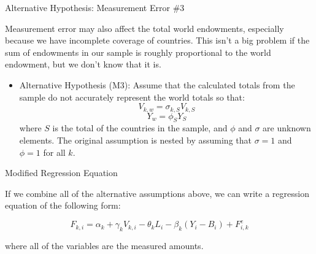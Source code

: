 \documentclass[aspectratio=169]{beamer}
\begin{document}
\begin{frame}{Alternative Hypothesis:  Measurement Error \#3}

Measurement error may also affect the total world endowments, especially because we have incomplete coverage of countries.  This isn’t a big problem if the sum of endowments in our sample is roughly proportional to the world endowment, but we don’t know that it is.

\begin{itemize}
    \item<1-> Alternative Hypothesis (M3):  Assume that the calculated totals from the sample do not accurately represent the world totals so that:
    \begin{equation*}
        V_{k,w} = \sigma_{k,S}V_{k,S}
    \end{equation*}
    \begin{equation*}
        Y_{w} = \phi_{S}Y_{S}
    \end{equation*}
    where $ S $ is the total of the countries in the sample, and $ \phi $ and $ \sigma $ are unknown elements.  The original assumption is nested by assuming that $ \sigma = 1 $ and $\phi = 1 $ for all $ k $. 
\end{itemize}
    
\end{frame}


\begin{frame}{Modified Regression Equation}

If we combine all of the alternative assumptions above, we can write a regression equation of the following form:

\begin{equation}
    F_{k,i} = \alpha_{k} + \gamma_{k}V_{k,i} - \theta_{k}L_{i} - \beta_{k}\left( Y_{i} - B_{i} \right) + F_{i,k}^{e}
    \label{eq:modifiedequation1}
\end{equation}

where all of the variables are the measured amounts.
    
\end{frame}

\end{document}
